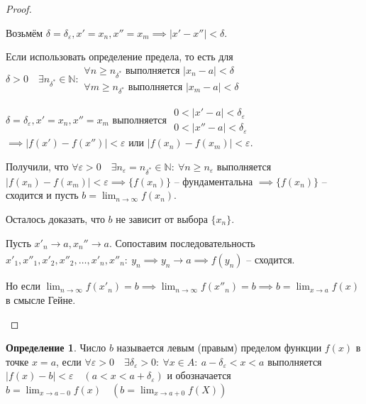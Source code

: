 \documentclass[a4paper,oneside]{article}
\newcommand{\dslim}{\displaystyle\lim}
\newcommand{\dslimn}{\dslim_{n \to \infty}}
\newcommand{\N}{\mathbb{N}}
\newcommand{\eps}{\varepsilon}
\newcommand{\approach}[1]{\underset{#1}{\longrightarrow}}
\theoremstyle{definition}
\newtheorem{definition}{Определение}[subsection]
\theoremstyle{definition}
\theoremstyle{definition}
\begin{document}
\begin{proof}
\begin{enumerate}[label=\alph*)]
            Возьмём $\delta = \delta_\eps, x' = x_n, x'' = x_m \implies | x' - x'' | < \delta$.

            Если использовать определение предела, то есть для $\delta > 0 \quad \exists n_{\delta^*} \in \N:
            \begin{array}{c}
                \forall n \ge n_{\delta^*} \text{ выполняется } | x_n - a | < \delta \\
                \forall m \ge n_{\delta^*} \text{ выполняется } | x_m - a | < \delta
            \end{array}$

            $\delta = \delta_\eps, x' = x_n, x'' = x_m$ выполняется
            $\begin{array}{c}
                0 < |x' - a| < \delta_\eps \\
                0 < |x'' - a| < \delta_\eps
            \end{array}$
            $\implies |f(x') - f(x'')| < \eps$ или $|f(x_n) - f(x_m)| < \eps$.
            
            Получили, что $\forall \eps > 0 \quad \exists n_\eps = n_{\delta^*} \in \N: \:
            \forall n \ge n_\eps$ выполняется $|f(x_n) - f(x_m)| < \eps \implies
            \{ f(x_n) \}$ -- фундаментальна $\implies \{ f(x_n) \}$ -- сходится и пусть
            $b = \dslimn f(x_n)$.

            Осталось доказать, что $b$ не зависит от выбора $\{ x_n \}$.

            Пусть $x'_n \approach{} a, x_n'' \approach{} a$. Сопоставим последовательность
            $x'_1, x''_1, x'_2, x''_2, \dots, x'_n, x''_n: \: y_n \implies y_n \approach{} a
            \implies f(y_n)$ -- сходится.

            Но если $\dslimn f(x'_n) = b \implies \dslimn f(x''_n) = b \implies b = \dslim_{x \to a} f(x)$
            в смысле Гейне.
    \end{enumerate}
\end{proof}

\begin{definition}
	Число $b$ называется левым (правым) пределом функции $f(x)$ в точке $x = a$, 
    если $\forall \eps > 0 \quad \exists \delta_\eps > 0: \: \forall x \in A: \: a - \delta_\eps < x < a$ 
    выполняется $|f(x) - b| < \eps \quad (a < x < a + \delta_\eps)$ и обозначается 
    $b = \dslim_{x \to a - 0} f(x) \quad (b = \dslim_{x \to a + 0} f(X))$
\end{definition}
\end{document}
